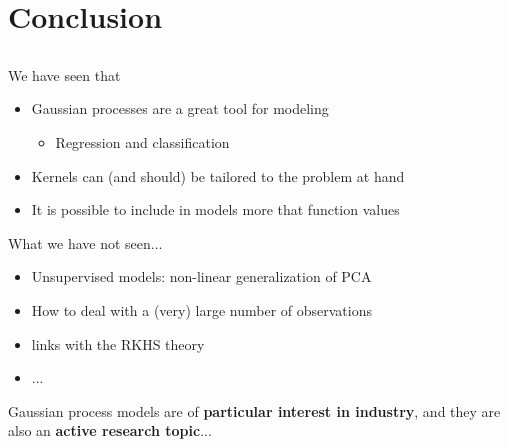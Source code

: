 \documentclass{beamer}
\begin{document}
\section{Conclusion}
\subsection{}

\begin{frame}{}
\begin{block}{We have seen that}
\begin{itemize}
 \item Gaussian processes are a great tool for modeling
 \begin{itemize}
 	\item Regression and classification
 \end{itemize}
 \item Kernels can (and should) be tailored to the problem at hand
 \item It is possible to include in models more that function values 
\end{itemize}
\end{block}
\vspace{0.2cm}
\begin{block}{What we have not seen...}
\begin{itemize}
 \item Unsupervised models: non-linear generalization of PCA
 \item How to deal with a (very) large number of observations
 \item links with the RKHS theory
 \item ...
\end{itemize}
\end{block}
\vspace{0.2cm}
Gaussian process models are of \textbf{particular interest in industry}, and they are also an \textbf{active research topic}...
\end{frame}
\end{document}
